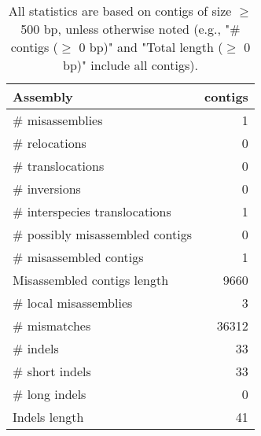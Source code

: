 \documentclass[12pt,a4paper]{article}
\begin{document}
\begin{table}[ht]
\begin{center}
\caption{All statistics are based on contigs of size $\geq$ 500 bp, unless otherwise noted (e.g., "\# contigs ($\geq$ 0 bp)" and "Total length ($\geq$ 0 bp)" include all contigs).}
\begin{tabular}{|l*{1}{|r}|}
\hline
Assembly & contigs \\ \hline
\# misassemblies & 1 \\ \hline
\hspace{5mm}\# relocations & 0 \\ \hline
\hspace{5mm}\# translocations & 0 \\ \hline
\hspace{5mm}\# inversions & 0 \\ \hline
\hspace{5mm}\# interspecies translocations & 1 \\ \hline
\# possibly misassembled contigs & 0 \\ \hline
\# misassembled contigs & 1 \\ \hline
Misassembled contigs length & 9660 \\ \hline
\# local misassemblies & 3 \\ \hline
\# mismatches & 36312 \\ \hline
\# indels & 33 \\ \hline
\hspace{5mm}\# short indels & 33 \\ \hline
\hspace{5mm}\# long indels & 0 \\ \hline
Indels length & 41 \\ \hline
\end{tabular}
\end{center}
\end{table}
\end{document}

